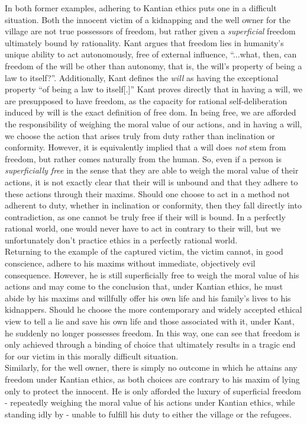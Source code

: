 \documentclass[12pt]{article}
\begin{document}
\begin{flushleft}
In both former examples, adhering to Kantian ethics puts one in a difficult situation. Both the innocent victim of a kidnapping and the well owner for the village are not true possessors of freedom, but rather given a \textit{superficial} freedom ultimately bound by rationality. Kant argues that freedom lies in humanity's unique ability to act autonomously, free of external influence, ``...what, then, can freedom of the will be other than autonomy, that is, the will's property of being a law to itself?''. Additionally, Kant defines the \textit{will} as having the exceptional property ``of being a law to itself[.]'' Kant proves directly that in having a will, we are presupposed to have freedom, as the capacity for rational self-deliberation induced by will is the exact definition of free
dom. In being free, we are afforded the responsibility of weighing the moral value of our actions, and in having a will, we choose the action that arises truly from duty rather than inclination or conformity.  However, it is equivalently implied that a will does \textit{not} stem from freedom, but rather comes naturally from the human. So, even if a person is \textit{superficially free} in the sense that they are able to weigh the moral value of their actions, it is not exactly clear that their will is unbound and that they adhere to these actions through their maxims. Should one choose to act in a method not adherent to duty, whether in inclination or conformity, then they fall directly into contradiction, as one cannot be truly free if their will is bound. In a perfectly rational world, one would never have to act in contrary to their will, but we unfortunately don't practice ethics in a perfectly rational world.\\
Returning to the example of the captured victim, the victim cannot, in good conscience, adhere to his maxims without immediate, objectively evil consequence. However, he is still superficially free to weigh the moral value of his actions and may come to the conclusion that, under Kantian ethics, he must abide by his maxims and willfully offer his own life and his family's lives to his kidnappers. Should he choose the more contemporary and widely accepted ethical view to tell a lie and save his own life and those associated with it, under Kant, he suddenly no longer possesses freedom. In this way, one can see that freedom is only achieved through a binding of choice that ultimately results in a tragic end for our victim in this morally difficult situation.\\
Similarly, for the well owner, there is simply no outcome in which he attains any freedom under Kantian ethics, as both choices are contrary to his maxim of lying only to protect the innocent. He is only afforded the luxury of superficial freedom - repeatedly weighing the moral value of his actions under Kantian ethics, while standing idly by - unable to fulfill his duty to either the village or the refugees.\\

\end{flushleft}
\end{document}
